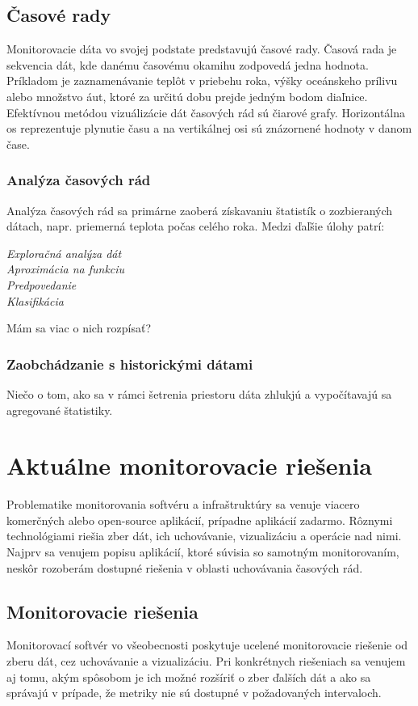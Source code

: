 \documentclass[11pt,final,oneside]{fithesis}
\begin{document}
\section{Časové rady}
Monitorovacie dáta vo svojej podstate predstavujú časové rady.
Časová rada je sekvencia dát, kde danému časovému okamihu zodpovedá jedna hodnota. Príkladom je zaznamenávanie teplôt v priebehu roka, výšky oceánskeho prílivu alebo množstvo áut, ktoré za určitú dobu
prejde jedným bodom diaľnice. Efektívnou metódou vizuálizácie dát časových rád sú čiarové grafy. Horizontálna os reprezentuje plynutie času a na vertikálnej osi sú znázornené hodnoty v danom čase.

\subsection{Analýza časových rád}
Analýza časových rád sa primárne zaoberá získavaniu štatistík o zozbieraných dátach, napr. priemerná teplota počas celého roka. Medzi ďaľšie úlohy patrí:
\begin{description}
\item[\emph{Exploračná analýza dát}]
\item[\emph{Aproximácia na funkciu}] 
\item[\emph{Predpovedanie}] 
\item[\emph{Klasifikácia}] 
\end{description}
Mám sa viac o nich rozpísať?

\subsection{Zaobchádzanie s historickými dátami}
Niečo o tom, ako sa v rámci šetrenia priestoru dáta zhlukjú a vypočítavajú sa agregované štatistiky.

\chapter{Aktuálne monitorovacie riešenia}
Problematike monitorovania softvéru a infraštruktúry sa venuje viacero komerčných alebo open-source aplikácií, prípadne aplikácií zadarmo. Rôznymi technológiami riešia zber dát, ich uchovávanie, vizualizáciu a operácie nad
nimi. Najprv sa venujem popisu aplikácií, ktoré súvisia so samotným monitorovaním, neskôr rozoberám dostupné riešenia v oblasti uchovávania časových rád.

\section{Monitorovacie riešenia}
Monitorovací softvér vo všeobecnosti poskytuje ucelené monitorovacie riešenie od zberu dát, cez uchovávanie a vizualizáciu. Pri konkrétnych riešeniach sa venujem aj tomu, akým spôsobom je ich možné
rozšíriť o zber ďalších dát a ako sa správajú v prípade, že metriky nie sú dostupné v požadovaných intervaloch.
\end{document}

